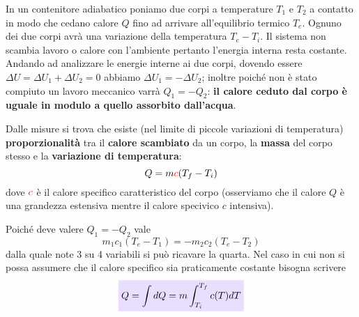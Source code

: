 \documentclass[x11names]{article}
\newcommand{\viola}[1]{\colorbox{yred}{$\displaystyle #1$}}
\begin{document}
	\noindent
	In un contenitore adiabatico poniamo due corpi a temperature \(T_1\) e \(T_2\) a contatto  in modo che cedano calore \(Q\) fino ad arrivare all'equilibrio termico \(T_e\). Ognuno dei due corpi avrà una variazione della temperatura \(T_{e} - T_i\). 
	Il sistema non scambia lavoro o calore con l'ambiente pertanto l'energia interna resta costante. Andando ad analizzare le energie interne ai due corpi, dovendo essere \(\Delta U = \Delta U_1 + \Delta U_2 = 0\) abbiamo \(\Delta U_1 = -\Delta U_2\); inoltre poiché non è stato compiuto un lavoro meccanico varrà \(Q_1 = -Q_2\): \textbf{il calore ceduto dal corpo è uguale in modulo a quello assorbito dall'acqua}.
	
	
	Dalle misure si trova che esiste (nel limite di piccole variazioni di temperatura) \textbf{proporzionalità} tra il \textbf{calore scambiato} da un corpo, la \textbf{massa} del corpo stesso e la \textbf{variazione di temperatura}:
	\[ 
	Q = m \textcolor{red}{c}(T_f - T_i)
	\]
	dove \(\textcolor{red}{c}\) è il calore specifico caratteristico del corpo (osserviamo che il calore \(Q\) è una grandezza estensiva mentre il calore specivico \(c\) intensiva).
	
	Poiché deve valere \(Q_1 = -Q_2\) vale
	\[ 
	m_1 c_1(T_e - T_1) = -m_2 c_2(T_e - T_2)
	\]
	dalla quale note 3 su 4 variabili si può ricavare la quarta. Nel caso in cui non si possa assumere che il calore specifico sia praticamente costante bisogna scrivere
	\begin{equation}
		\viola{Q = \int dQ = m \int_{T_i}^{T_{f}}c(T)dT}
	\end{equation}
	
	
\end{document}
